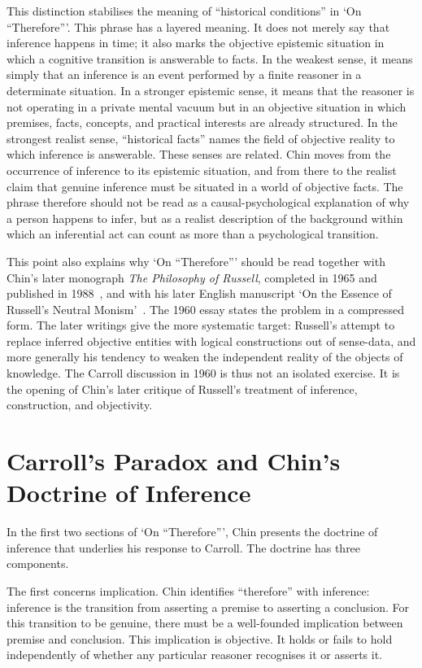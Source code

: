 \documentclass{birkjour}
\begin{document}
This distinction stabilises the meaning of ``historical conditions'' in `On ``Therefore'''. This phrase has a layered meaning. It does not merely say that inference happens in time; it also marks the objective epistemic situation in which a cognitive transition is answerable to facts. In the weakest sense, it means simply that an inference is an event performed by a finite reasoner in a determinate situation. In a stronger epistemic sense, it means that the reasoner is not operating in a private mental vacuum but in an objective situation in which premises, facts, concepts, and practical interests are already structured. In the strongest realist sense, ``historical facts'' names the field of objective reality to which inference is answerable. These senses are related. Chin moves from the occurrence of inference to its epistemic situation, and from there to the realist claim that genuine inference must be situated in a world of objective facts. The phrase therefore should not be read as a causal-psychological explanation of why a person happens to infer, but as a realist description of the background within which an inferential act can count as more than a psychological transition.

This point also explains why `On ``Therefore''' should be read together with Chin's later monograph \textit{The Philosophy of Russell}, completed in 1965 and published in 1988~\cite{Jin1988}, and with his later English manuscript `On the Essence of Russell's Neutral Monism'~\cite{JinNeutralMonism}. The 1960 essay states the problem in a compressed form. The later writings give the more systematic target: Russell's attempt to replace inferred objective entities with logical constructions out of sense-data, and more generally his tendency to weaken the independent reality of the objects of knowledge. The Carroll discussion in 1960 is thus not an isolated exercise. It is the opening of Chin's later critique of Russell's treatment of inference, construction, and objectivity.

\section{Carroll's Paradox and Chin's Doctrine of Inference}

In the first two sections of `On ``Therefore''', Chin presents the doctrine of inference that underlies his response to Carroll. The doctrine has three components.

The first concerns implication. Chin identifies ``therefore'' with inference: inference is the transition from asserting a premise to asserting a conclusion. For this transition to be genuine, there must be a well-founded implication between premise and conclusion. This implication is objective. It holds or fails to hold independently of whether any particular reasoner recognises it or asserts it.
\end{document}
